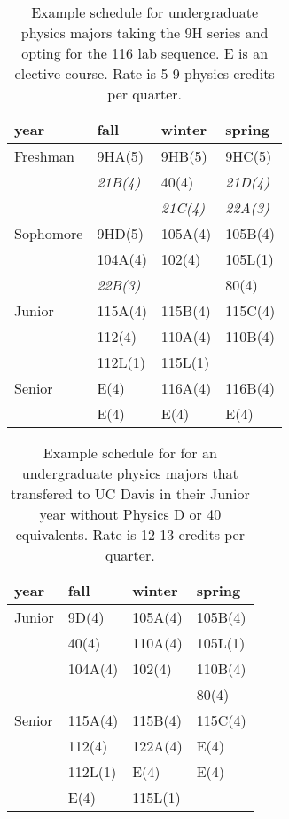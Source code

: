 \documentclass[12pt]{article}
\begin{document}
\begin{table}
\caption{Example schedule for undergraduate physics majors taking the 9H series and opting for the 116 lab sequence.  E is an elective course.  Rate is 5-9 physics credits per quarter.}
\label{tbl:proposed-honors}
\begin{center}
\begin{tabular}{|l|l|l|l|}
\hline
year      & fall    & winter & spring \\
\hline
Freshman  & 9HA(5)    & 9HB(5)    & 9HC(5) \\
          & {\it 21B(4)} & 40(4)     & {\it 21D(4)} \\
          &           & {\it 21C(4)}     & {\it 22A(3)}\\
\hline
Sophomore & 9HD(5)       & 105A(4)   &  105B(4) \\
          & 104A(4)      & 102(4)    &  105L(1) \\
          & {\it 22B(3)} &           &  80(4)\\
\hline
Junior    & 115A(4) & 115B(4)  & 115C(4)\\
          & 112(4)  & 110A(4)  & 110B(4)\\
		  & 112L(1) & 115L(1)  & \\
\hline
Senior    & E(4)    & 116A(4)  & 116B(4) \\
          & E(4)    & E(4)     & E(4) \\

\hline  
\end{tabular}
\end{center}
\end{table}

\begin{table}

\caption{Example schedule for for an undergraduate physics majors that transfered to UC Davis in their Junior year without Physics D or 40 equivalents.  Rate is 12-13 credits per quarter.}
\label{tbl:proposed-transfers}
\begin{center}
\begin{tabular}{|l|l|l|l|}
\hline
year      & fall    & winter & spring \\
\hline
Junior   & 9D(4)     & 105A(4)       & 105B(4) \\
         & 40(4)     & 110A(4)       & 105L(1) \\         
         & 104A(4)   & 102(4)        & 110B(4) \\
         &           &               & 80(4) \\
\hline
Senior   & 115A(4)   & 115B(4)       & 115C(4) \\
         & 112(4)    & 122A(4)       & E(4) \\
         & 112L(1)   & E(4)          & E(4)  \\
		 & E(4)      & 115L(1)       & \\
\hline 
\end{tabular}
\end{center}
\end{table}
\end{document}
